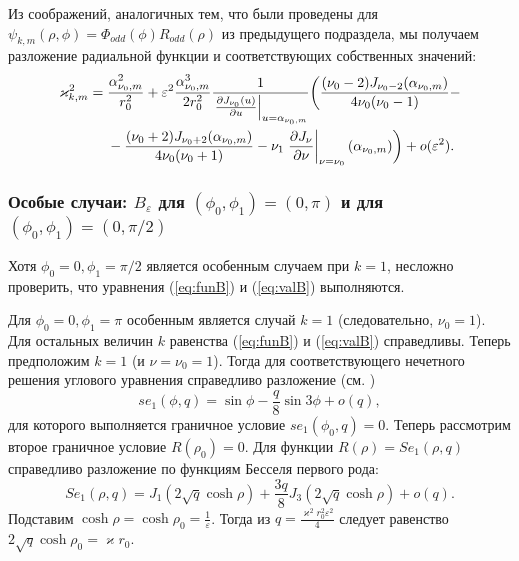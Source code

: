 Из соображений, аналогичных тем, что были проведены для  $\psi_{k, m}(\rho, \phi) = \Phi_{odd}(\phi) R_{odd}(\rho)$ из предыдущего подраздела,
мы получаем разложение радиальной функции и соответствующих собственных значений:
\begin{align*}
    \varkappa_{k, m}^2 ={}& \frac{\alpha_{\nu_0, m}^2}{r_0^2} +  \varepsilon^2 \frac{\alpha_{\nu_0, m}^3}{2 r_0^2}\frac{1}{ \left.\frac{\partial J_{\nu_0}(u)}{\partial u}\right|_{u=\alpha_{\nu_0, m}} }\biggl(\frac{(\nu_0 - 2)J_{\nu_0-2}(\alpha_{\nu_0, m})   }{4\nu_0 (\nu_0-1)} - \notag \\
&{}- \frac{(\nu_0 + 2)J_{\nu_0+2}(\alpha_{\nu_0, m})}{4\nu_0 (\nu_0+1)}  - \nu_1 \left.\frac{\partial J_\nu}{\partial \nu}\right|_{\nu = \nu_0}(\alpha_{\nu_0, m})
    \biggr) + o(\varepsilon^2).
\end{align*}

\subsubsection{Особые случаи: $B_\varepsilon$ для $(\phi_0, \phi_1)=(0,\pi)$ и для $(\phi_0, \phi_1)=(0,\pi/2)$}\label{sec:ch2/sec2/sub3/sub2}


Хотя $\phi_0=0, \phi_1=\pi/2$ является особенным случаем при $k=1$,
несложно проверить, что уравнения (\ref{eq:funB}) и (\ref{eq:valB}) выполняются.

Для  $\phi_0=0, \phi_1=\pi$
особенным является случай  $k=1$ (следовательно, $\nu_0=1$). 
Для остальных величин $k$ равенства (\ref{eq:funB}) и (\ref{eq:valB}) справедливы.
Теперь предположим $k=1$ (и $\nu=\nu_0 = 1$).
Тогда для соответствующего нечетного решения углового уравнения справедливо разложение  (см. \cite[Subsect.~20.2.27]{wref2})
\begin{equation*}
se_1(\phi, q) = 	\sin{\phi}  - 	\frac{q}{8} \sin{3\phi} + o(q),
 \end{equation*}
для которого выполняется граничное условие $se_1(\phi_0, q)=0$. 
Теперь рассмотрим второе граничное условие $R(\rho_0) = 0$. 
Для функции $R(\rho) = Se_1(\rho, q)$ справедливо разложение по функциям Бесселя первого рода:
\begin{equation*}
Se_1(\rho, q) = J_1(2\sqrt{q} \cosh{\rho}) + \frac{3 q}{8} J_3(2\sqrt{q}\cosh{\rho}) + o(q).
\end{equation*}
Подставим $\cosh \rho = \cosh \rho_0 =\frac{1}{\varepsilon}$.
Тогда из $q = \frac{\varkappa^2 r_0^2 \varepsilon^2}{4}$ следует равенство
$2\sqrt{q} \cosh{\rho_0} =  \varkappa r_0$.

